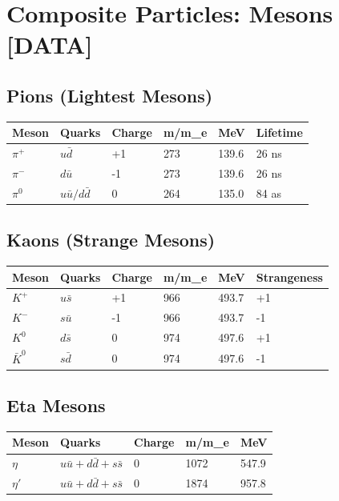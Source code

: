 \documentclass[
  11pt,
  letterpaper,
  twoside,
  openany]{book}
\makeatletter
\let\orig@section\section
\renewcommand{\section}{\needspace{8\baselineskip}\orig@section}
\let\orig@subsection\subsection
\renewcommand{\subsection}{\needspace{6\baselineskip}\orig@subsection}
\makeatother
\begin{document}
\section{Composite Particles: Mesons
{[}DATA{]}}\label{composite-particles-mesons-data}

\subsection{Pions (Lightest Mesons)}\label{pions-lightest-mesons}

\begin{longtable}[]{@{}llllll@{}}
\toprule\noalign{}
Meson & Quarks & Charge & m/m\_e & MeV & Lifetime \\
\midrule\noalign{}
\endhead
\bottomrule\noalign{}
\endlastfoot
\(\pi^+\) & \(u\bar{d}\) & +1 & 273 & 139.6 & 26 ns \\
\(\pi^-\) & \(d\bar{u}\) & -1 & 273 & 139.6 & 26 ns \\
\(\pi^0\) & \(u\bar{u}/d\bar{d}\) & 0 & 264 & 135.0 & 84 as \\
\end{longtable}

\subsection{Kaons (Strange Mesons)}\label{kaons-strange-mesons}

\begin{longtable}[]{@{}llllll@{}}
\toprule\noalign{}
Meson & Quarks & Charge & m/m\_e & MeV & Strangeness \\
\midrule\noalign{}
\endhead
\bottomrule\noalign{}
\endlastfoot
\(K^+\) & \(u\bar{s}\) & +1 & 966 & 493.7 & +1 \\
\(K^-\) & \(s\bar{u}\) & -1 & 966 & 493.7 & -1 \\
\(K^0\) & \(d\bar{s}\) & 0 & 974 & 497.6 & +1 \\
\(\bar{K}^0\) & \(s\bar{d}\) & 0 & 974 & 497.6 & -1 \\
\end{longtable}

\subsection{Eta Mesons}\label{eta-mesons}

\begin{longtable}[]{@{}lllll@{}}
\toprule\noalign{}
Meson & Quarks & Charge & m/m\_e & MeV \\
\midrule\noalign{}
\endhead
\bottomrule\noalign{}
\endlastfoot
\(\eta\) & \(u\bar{u}+d\bar{d}+s\bar{s}\) & 0 & 1072 & 547.9 \\
\(\eta'\) & \(u\bar{u}+d\bar{d}+s\bar{s}\) & 0 & 1874 & 957.8 \\
\end{longtable}
\end{document}
